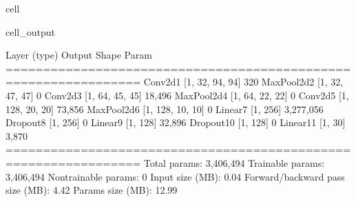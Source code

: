 \documentclass[letterpaper,10pt,english]{jupyterBook}
\begin{document}
\begin{sphinxuseclass}{cell}
\begin{sphinxVerbatimOutput}
\begin{sphinxuseclass}{cell_output}
\begin{sphinxVerbatim}[commandchars=\\\{\}]
\PYGZhy{}\PYGZhy{}\PYGZhy{}\PYGZhy{}\PYGZhy{}\PYGZhy{}\PYGZhy{}\PYGZhy{}\PYGZhy{}\PYGZhy{}\PYGZhy{}\PYGZhy{}\PYGZhy{}\PYGZhy{}\PYGZhy{}\PYGZhy{}\PYGZhy{}\PYGZhy{}\PYGZhy{}\PYGZhy{}\PYGZhy{}\PYGZhy{}\PYGZhy{}\PYGZhy{}\PYGZhy{}\PYGZhy{}\PYGZhy{}\PYGZhy{}\PYGZhy{}\PYGZhy{}\PYGZhy{}\PYGZhy{}\PYGZhy{}\PYGZhy{}\PYGZhy{}\PYGZhy{}\PYGZhy{}\PYGZhy{}\PYGZhy{}\PYGZhy{}\PYGZhy{}\PYGZhy{}\PYGZhy{}\PYGZhy{}\PYGZhy{}\PYGZhy{}\PYGZhy{}\PYGZhy{}\PYGZhy{}\PYGZhy{}\PYGZhy{}\PYGZhy{}\PYGZhy{}\PYGZhy{}\PYGZhy{}\PYGZhy{}\PYGZhy{}\PYGZhy{}\PYGZhy{}\PYGZhy{}\PYGZhy{}\PYGZhy{}\PYGZhy{}\PYGZhy{}
        Layer (type)               Output Shape         Param \PYGZsh{}
================================================================
            Conv2d\PYGZhy{}1           [\PYGZhy{}1, 32, 94, 94]             320
         MaxPool2d\PYGZhy{}2           [\PYGZhy{}1, 32, 47, 47]               0
            Conv2d\PYGZhy{}3           [\PYGZhy{}1, 64, 45, 45]          18,496
         MaxPool2d\PYGZhy{}4           [\PYGZhy{}1, 64, 22, 22]               0
            Conv2d\PYGZhy{}5          [\PYGZhy{}1, 128, 20, 20]          73,856
         MaxPool2d\PYGZhy{}6          [\PYGZhy{}1, 128, 10, 10]               0
            Linear\PYGZhy{}7                  [\PYGZhy{}1, 256]       3,277,056
           Dropout\PYGZhy{}8                  [\PYGZhy{}1, 256]               0
            Linear\PYGZhy{}9                  [\PYGZhy{}1, 128]          32,896
          Dropout\PYGZhy{}10                  [\PYGZhy{}1, 128]               0
           Linear\PYGZhy{}11                   [\PYGZhy{}1, 30]           3,870
================================================================
Total params: 3,406,494
Trainable params: 3,406,494
Non\PYGZhy{}trainable params: 0
\PYGZhy{}\PYGZhy{}\PYGZhy{}\PYGZhy{}\PYGZhy{}\PYGZhy{}\PYGZhy{}\PYGZhy{}\PYGZhy{}\PYGZhy{}\PYGZhy{}\PYGZhy{}\PYGZhy{}\PYGZhy{}\PYGZhy{}\PYGZhy{}\PYGZhy{}\PYGZhy{}\PYGZhy{}\PYGZhy{}\PYGZhy{}\PYGZhy{}\PYGZhy{}\PYGZhy{}\PYGZhy{}\PYGZhy{}\PYGZhy{}\PYGZhy{}\PYGZhy{}\PYGZhy{}\PYGZhy{}\PYGZhy{}\PYGZhy{}\PYGZhy{}\PYGZhy{}\PYGZhy{}\PYGZhy{}\PYGZhy{}\PYGZhy{}\PYGZhy{}\PYGZhy{}\PYGZhy{}\PYGZhy{}\PYGZhy{}\PYGZhy{}\PYGZhy{}\PYGZhy{}\PYGZhy{}\PYGZhy{}\PYGZhy{}\PYGZhy{}\PYGZhy{}\PYGZhy{}\PYGZhy{}\PYGZhy{}\PYGZhy{}\PYGZhy{}\PYGZhy{}\PYGZhy{}\PYGZhy{}\PYGZhy{}\PYGZhy{}\PYGZhy{}\PYGZhy{}
Input size (MB): 0.04
Forward/backward pass size (MB): 4.42
Params size (MB): 12.99

\end{sphinxVerbatim}
\end{sphinxuseclass}
\end{sphinxVerbatimOutput}
\end{sphinxuseclass}
\end{document}
